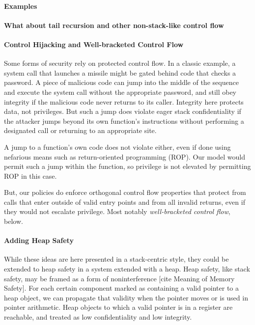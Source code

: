 \documentclass[acmsmall,review,anonymous]{acmart}\settopmatter{printfolios=true,printccs=false,printacmref=false}
\begin{document}
  \paragraph{Examples}


  \paragraph{What about tail recursion and other non-stack-like control flow}

  \paragraph{Control Hijacking and Well-bracketed Control Flow}
  
    Some forms of security rely on protected control flow. In a classic
    example, a system call that launches a missile might be gated behind code
    that checks a password. A piece of malicious code can jump into the middle
    of the sequence and execute the system call without the appropriate password,
    and still obey integrity if the malicious code never returns to its caller.
    Integrity here protects data, not privileges. But such a jump does violate
    eager stack confidentiality if the attacker jumps beyond its own function's
    instructions without performing a designated call or returning to an
    appropriate site.

    A jump to a function's own code does not violate either, even if done using
    nefarious means such as return-oriented programming (ROP). Our model would
    permit such a jump within the function, so privilege is not elevated by
    permitting ROP in this case.

    But, our policies do enforce orthogonal control flow properties that
    protect from calls that enter outside of valid entry points and from all
    invalid returns, even if they would not escalate privilege. Most notably
    {\em well-bracketed control flow}, below.

  \paragraph{Adding Heap Safety}

    While these ideas are here presented in a stack-centric style, they could
    be extended to heap safety in a system extended with a heap. Heap safety,
    like stack safety, may be framed as a form of noninterference
    [cite Meaning of Memory Safety]. For each certain component marked as
    containing a valid pointer to a heap object, we can propagate that
    validity when the pointer moves or is used in pointer arithmetic. Heap
    objects to which a valid pointer is in a register are reachable, and
    treated as low confidentiality and low integrity.
\end{document}
